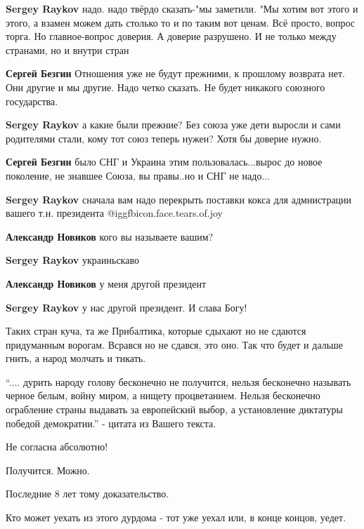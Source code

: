 \begin{itemize}
\begin{itemize}
\textbf{Sergey Raykov} надо. надо твёрдо сказать-"мы заметили. "Мы хотим вот этого и этого, а взамен можем дать столько то и по таким вот ценам. Всё просто, вопрос торга. Но главное-вопрос доверия. А доверие разрушено. И не только между странами, но и внутри стран

\textbf{Сергей Безгин} Отношения уже не будут прежними, к прошлому возврата нет. Они другие и мы другие. Надо четко сказать. Не будет никакого союзного государства.

\textbf{Sergey Raykov} а какие были прежние? Без союза уже дети выросли и сами родителями стали, кому тот союз теперь нужен? Хотя бы доверие нужно.

\textbf{Сергей Безгин} было СНГ и Украина этим пользовалась...вырос до новое поколение, не знавшее Союза, вы правы..но и СНГ не надо...

\textbf{Sergey Raykov} сначала вам надо перекрыть поставки кокса для адмнистрации вашего т.н. президента  @igg{fbicon.face.tears.of.joy} 

\textbf{Александр Новиков} кого вы называете вашим?

\textbf{Sergey Raykov} украиньскаво

\textbf{Александр Новиков} у меня другой президент

\textbf{Sergey Raykov} у нас другой президент. И слава Богу!
\end{itemize} %


Таких стран куча, та же Прибалтика, которые сдыхают но не сдаются придуманным
ворогам. Всрався но не сдався, это оно. Так что будет и дальше гнить, а народ
молчать и тикать.


\enquote{.... дурить народу голову бесконечно не получится, нельзя бесконечно называть
черное белым, войну миром, а нищету процветанием. Нельзя бесконечно ограбление
страны выдавать за европейский выбор, а установление диктатуры победой
демократии.} - цитата из Вашего текста.

Не согласна абсолютно!

Получится. Можно.

Последние 8 лет тому доказательство.

Кто может уехать из этого дурдома - тот уже уехал или, в конце концов, уедет.


\end{itemize}
